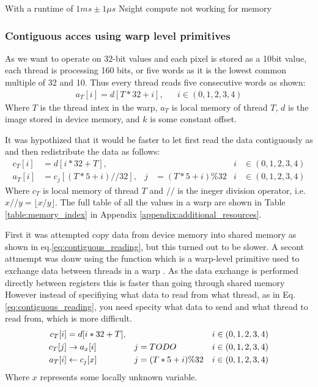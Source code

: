 With a runtime of $1 ms \pm 1 \mu s$
Nsight compute not working for memory

\subsubsection{Contiguous acces using warp level primitives} \label{sec:contuguous_access}
As we want to operate on 32-bit values and each pixel is stored as a 10bit value, each thread is processing 160 bits, or five words as it is the lowest common multiple of 32 and 10.
Thus every thread reads five consecutive words as shown:
\begin{align}
    a_T[i] = d[T*32+i], &  & i \in (0,1,2,3,4)
\end{align}
Where $T$ is the thread intex in the warp, $a_T$ is local memory of thread $T$, $d$ is the image stored in device memory, and $k$ is some constant offset.

It was hypothized that it would be faster to let first read the data contiguously as and then redistribute the data as follows:
\begin{align}
    c_T[i] & = d[i*32+T],        &   &                 & i & \in (0,1,2,3,4) \\
    a_T[i] & = c_j[(T*5+i)//32], & j & = (T*5 + i)\%32 & i & \in (0,1,2,3,4)
    \label{eq:contiguous_reading}
\end{align}
Where $c_T$ is local memory of thread $T$ and $//$ is the ineger division operator, i.e. $x//y = \lfloor x/y \rfloor$.
The full table of all the values in a warp are shown in Table \ref{table:memory_index} in Appendix \ref{appendix:additional_resources}.

First it was attempted copy data from device memory into shared memory as shown in eq.\ref{eq:contiguous_reading}, but this turned out to be slower.
A secont attmempt was donw using the  function which is a warp-level primitive used to exchange data between threads in a warp \cite{linUsingCUDAWarpLevel2018}.
As the data exchange is performed directly between registers this is faster than going through shared memory \cite{linUsingCUDAWarpLevel2018}
However instead of specifiying what data to read from what thread, as in Eq. \ref{eq:contiguous_reading}, you need specity what data to send and what thread to read from, which is more difficult.
\begin{align}
    c_T[i] & = d[i*32+T],       &   &                 & i & \in (0,1,2,3,4) \\
    c_T[j] & \rightarrow a_x[i] & j & = TODO         & i & \in (0,1,2,3,4) \\
    a_T[i] & \leftarrow c_j[x]  & j & = (T*5 + i)\%32 & i & \in (0,1,2,3,4)
    \label{eq:contiguous_reading}
\end{align}
Where $x$ represents some locally unknown variable.

